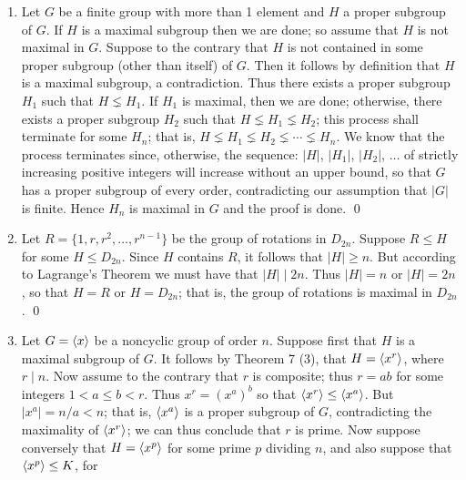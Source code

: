 \begin{enumerate}
      \begin{enumerate}
         \item Let $G$ be a finite group with more than 1 element and $H$ a 
               proper subgroup of $G$. If $H$ is a maximal subgroup then we are
               done; so assume that $H$ is not maximal in $G$. Suppose to the
               contrary that $H$ is not contained in some proper subgroup (other
               than itself) of $G$. Then it follows by definition that $H$ is a
               maximal subgroup, a contradiction. Thus there exists a proper
               subgroup $H_1$ such that $H \lneq H_1$. If $H_1$ is maximal, then
               we are done; otherwise, there exists a proper subgroup $H_2$
               such that $H \lneq H_1 \lneq H_2$; this process shall terminate
               for some $H_n$; that is,
               $H \lneq H_1 \lneq H_2 \lneq \cdots \lneq H_n$. We know that the
               process terminates since, otherwise, the sequence:
               $|H|$, $|H_1|$, $|H_2|$, $\ldots$ of strictly increasing positive 
               integers will increase without an upper bound, so that $G$ has a 
               proper subgroup of every order, contradicting our assumption that 
               $|G|$ is finite.
               Hence $H_n$ is maximal in $G$ and the proof is done. \qed
         \item Let $R = \{1, r, r^2, \ldots, r^{n-1}\}$ be the group of
               rotations in $D_{2n}$. Suppose $R \le H$ for some $H \le D_{2n}$.
               Since $H$ contains $R$, it follows that $|H| \ge n$. But
               according to Lagrange's Theorem we must have that $|H| \mid 2n$.
               Thus $|H| = n$ or $|H| = 2n$, so that $H = R$ or $H = D_{2n}$; 
               that is, the group of rotations is maximal in $D_{2n}$. \qed
         \item Let $G = \langle x \rangle$ be a noncyclic group of order $n$. Suppose
               first that $H$ is a maximal subgroup of $G$. It follows by
               Theorem 7 (3), that $H = \langle x^r \rangle$, where $r \mid n$. Now
               assume to the contrary that $r$ is composite; thus $r = ab$ for 
               some integers $1 < a \le b < r$. Thus $x^r = (x^a)^b$ so that
               $\langle x^r \rangle \le \langle x^a \rangle$. But $|x^a| = n/a < n$; that is,
               $\langle x^a \rangle$ is a proper subgroup of $G$, contradicting the 
               maximality of $\langle x^r \rangle$; we can thus conclude that $r$ is
               prime. Now suppose conversely that $H = \langle x^p \rangle$ for some prime 
               $p$ dividing $n$, and also suppose that $\langle x^p \rangle \le K$, for 

\end{enumerate}
\end{enumerate}
